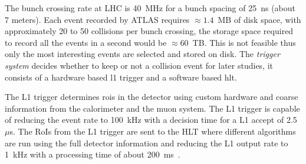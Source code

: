 The bunch crossing rate at LHC is 40~MHz for a bunch spacing of 25~ns (about 7
meters). Each event recorded by ATLAS requires $\approx 1.4$~MB of disk space,
with approximately 20 to 50 collisions per bunch crossing, the storage space
required to record all the events in a second would be $\approx 60$~TB. This is
not feasible thus only the most interesting events are selected and stored on
disk. The \emph{trigger system} decides whether to keep or not a collision event
for later studies, it consists of a hardware based \gls{l1} trigger and a
software based \gls{hlt}.

The L1 trigger determines \gls{rois} in the detector using custom hardware and
coarse information from the calorimeter and the muon system. The L1 trigger is
capable of reducing the event rate to 100~kHz with a decision time for a L1
accept of 2.5~$\mu$s. The RoIs from the L1 trigger are sent to the HLT where
different algorithms are run using the full detector information and reducing
the L1 output rate to 1~kHz with a processing time of about
200~ms~\cite{trigger}. %
